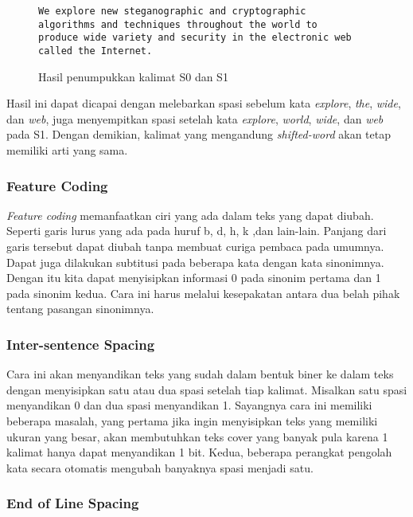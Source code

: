 \begin{figure}[H]
	\texttt{We  explore  new  steganographic  and  cryptographic\\
	algorithms  and  techniques  throughout  the  world  to\\
	produce  wide  variety  and  security  in  the  electronic  web\\
	called  the  Internet.}
	\caption{Hasil penumpukkan kalimat S0 dan S1}
\end{figure}


Hasil ini dapat dicapai dengan melebarkan spasi sebelum kata \textit{explore}, \textit{the}, \textit{wide}, dan \textit{web}, juga menyempitkan spasi setelah kata \textit{explore}, \textit{world}, \textit{wide}, dan \textit{web} pada S1. Dengan demikian, kalimat yang mengandung \textit{shifted-word} akan tetap memiliki arti yang sama.

\subsubsection{Feature Coding}

\textit{Feature coding} memanfaatkan ciri yang ada dalam teks yang dapat diubah. Seperti garis lurus yang ada pada huruf b, d, h, k ,dan lain-lain. Panjang dari garis tersebut dapat diubah tanpa membuat curiga pembaca pada umumnya. Dapat juga dilakukan subtitusi pada beberapa kata dengan kata sinonimnya. Dengan itu kita dapat menyisipkan informasi 0 pada sinonim pertama dan 1 pada sinonim kedua. Cara ini harus melalui kesepakatan antara dua belah pihak tentang pasangan sinonimnya.

\subsubsection{Inter-sentence Spacing}

Cara ini akan menyandikan teks yang sudah dalam bentuk biner ke dalam teks dengan menyisipkan satu atau dua spasi setelah tiap kalimat. Misalkan satu spasi menyandikan 0 dan dua spasi menyandikan 1. Sayangnya cara ini memiliki beberapa masalah, yang pertama jika ingin menyisipkan teks yang memiliki ukuran yang besar, akan membutuhkan teks cover yang banyak pula karena 1 kalimat hanya dapat menyandikan 1 bit. Kedua, beberapa perangkat pengolah kata secara otomatis mengubah banyaknya spasi menjadi satu.

\subsubsection{End of Line Spacing}

